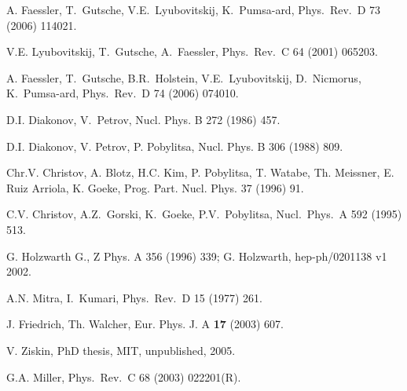 \begin{thebibliography}{PPV06}
  A. Faessler, T.~Gutsche, V.E.~Lyubovitskij, K.~Pumsa-ard,
  Phys.\ Rev.\ D  73 (2006) 114021. 

  V.E. Lyubovitskij, T.~Gutsche, A.~Faessler,
  Phys.\ Rev.\  C  64 (2001) 065203. 

  A. Faessler, T.~Gutsche, B.R.~Holstein, V.E.~Lyubovitskij, D.~Nicmorus, K.~Pumsa-ard,
  Phys.\ Rev.\  D  74 (2006) 074010. 

D.I. Diakonov, V.~Petrov,
Nucl. Phys.  B 272  (1986) 457.

D.I. Diakonov, V. Petrov, P. Pobylitsa,
Nucl. Phys.  B 306 (1988) 809.

Chr.V. Christov, A. Blotz, H.C. Kim, P. Pobylitsa, T. Watabe,
Th. Meissner, E. Ruiz Arriola, K. Goeke,
Prog. Part. Nucl. Phys.  37 (1996) 91.

  C.V. Christov, A.Z.~Gorski, K.~Goeke, P.V.~Pobylitsa,
  Nucl.\ Phys.\ A  592 (1995) 513.

G. Holzwarth G., Z Phys. A  356 (1996) 339; G. Holzwarth, hep-ph/0201138 v1 2002.

  A.N. Mitra, I.~Kumari,
  Phys.\ Rev.\ D  15 (1977) 261.

J. Friedrich, Th. Walcher, Eur. Phys. J. A {\bf 17} (2003) 607.

V. Ziskin, PhD thesis, MIT, unpublished, 2005. 

  G.A. Miller,
  Phys.\ Rev.\ C  68 (2003) 022201(R).


\end{thebibliography}
